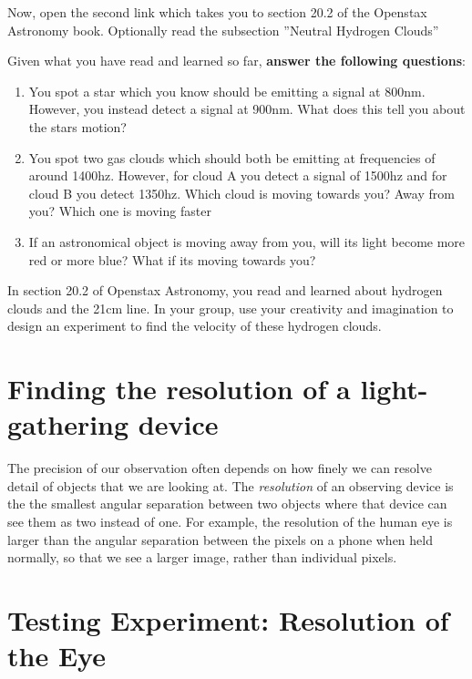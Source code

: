 \begin{steps}	
	\item Now, open the second link which takes you to section 20.2 of the Openstax Astronomy book. Optionally read the subsection ''Neutral Hydrogen Clouds'' %
	
	\item Given what you have read and learned so far, \textbf{answer the following questions}:
	\begin{enumerate}
		\item You spot a star which you know should be emitting a signal at 800nm. However, you instead detect a signal at 900nm. What does this tell you about the stars motion? 
		
		\item You spot two gas clouds which should both be emitting at frequencies of around 1400hz. However, for cloud A you detect a signal of 1500hz and for cloud B you detect 1350hz. Which cloud is moving towards you? Away from you? Which one is moving faster 
		
		\item If an astronomical object is moving away from you, will its light become more red or more blue? What if its moving towards you?
	\end{enumerate}
	
	\item In section 20.2 of Openstax Astronomy, you read and learned about hydrogen clouds and the 21cm line. In your group, use your creativity and imagination to design an experiment to find the velocity of these hydrogen clouds. 
\end{steps}
	
\section{Finding the resolution of a light-gathering device}

The precision of our observation often depends on how finely we can resolve detail of objects that we are looking at. The \textit{resolution} of an observing device is the the smallest angular separation between two objects where that device can see them as two instead of one. For example, the resolution of the human eye is larger than the angular separation between the pixels on a phone when held normally, so that we see a larger image, rather than individual pixels.

\section{Testing Experiment: Resolution of the Eye}

